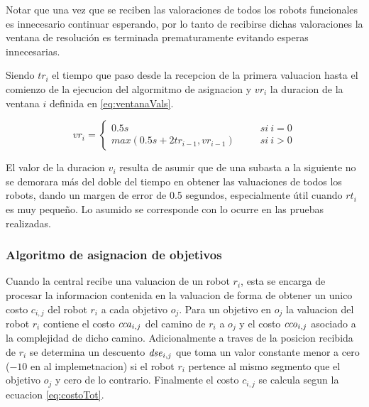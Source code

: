 Notar que una vez que se reciben las valoraciones de todos los robots
funcionales es innecesario continuar esperando, por lo tanto de recibirse
dichas valoraciones la ventana de resolución es terminada prematuramente
evitando esperas innecesarias.

Siendo $tr_i$ el tiempo que paso desde la recepcion de la primera valuacion
hasta el comienzo de la ejecucion del algormitmo de asignacion y $vr_i$ la
duracion de la ventana $i$ definida en \ref{eq:ventanaVals}.

\begin{equation} 
  vr_i = 
  \left \{ 
    \begin{aligned}
      0.5s                            \ \ \ \ \ \ \ \ & si\ i = 0\\ 
      max(0.5s + 2tr_{i-1}, vr_{i-1}) \ \ \ \ \ \ \ \ & si\ i > 0
    \end{aligned}
  \right .
  \label{eq:ventanaVals}
\end{equation}

El valor de la duracion $v_i$ resulta de asumir que de una subasta a la
siguiente no se demorara más del doble del tiempo en obtener las valuaciones de
todos los robots, dando un margen de error de 0.5 segundos, especialmente útil
cuando $rt_i$ es muy pequeño. Lo asumido se corresponde con lo ocurre en las
pruebas realizadas.




\subsubsection{Algoritmo de asignacion de objetivos}
Cuando la central recibe una valuacion de un robot $r_i$, esta se encarga de
procesar la informacion contenida en la valuacion de forma de obtener un unico
costo $c_{i,j}$ del robot $r_i$ a cada objetivo $o_j$. Para un objetivo en
$o_j$ la valuacion del robot $r_i$ contiene el costo $\mathit{cca}_{i,j}$ del camino de
$r_i$ a $o_j$ y el costo $\mathit{cco}_{i,j}$ asociado a la complejidad de dicho camino.
Adicionalmente a traves de la posicion recibida de $r_i$ se determina un descuento 
$\mathit{dse}_{i,j}$ que toma un valor constante menor a cero ($-10$ en al
implemetnacion) si el robot $r_i$ pertence al mismo segmento que el objetivo
$o_j$ y cero de lo contrario. Finalmente el costo $c_{i,j}$ se calcula segun la
ecuacion \ref{eq:costoTot}.

